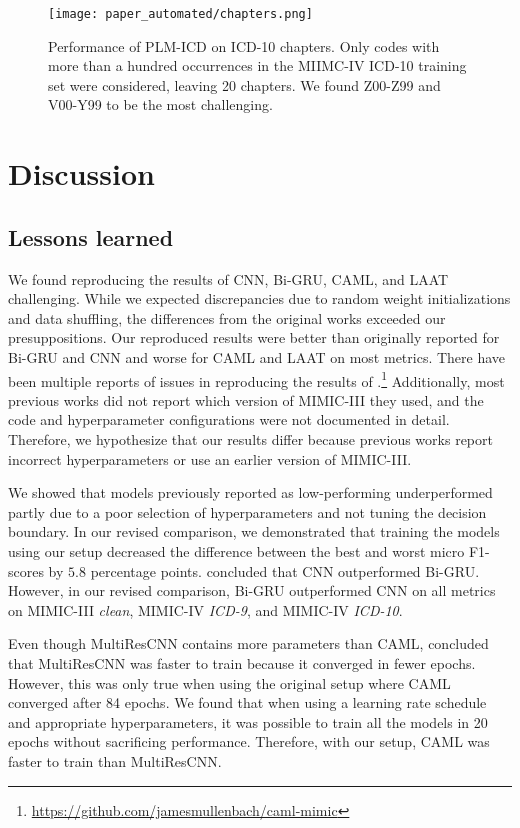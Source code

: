 {\begin{figure}
    \centering
    \texttt{[image: paper\_automated/chapters.png]}
    \caption[Performance of PLM-ICD on ICD-10 chapters.]{Performance of PLM-ICD on ICD-10 chapters. Only codes with more than a hundred occurrences in the MIIMC-IV ICD-10 training set were considered, leaving 20 chapters. We found Z00-Z99 and V00-Y99 to be the most challenging.}
    \label{fig:chapter_performance}
\end{figure}




\section{Discussion}
\subsection{Lessons learned}
We found reproducing the results of CNN, Bi-GRU, CAML, and LAAT challenging. While we expected discrepancies due to random weight initializations and data shuffling, the differences from the original works exceeded our presuppositions. Our reproduced results were better than originally reported for Bi-GRU and CNN and worse for CAML and LAAT on most metrics. There have been multiple reports of issues in reproducing the results of \textcite{mullenbachExplainablePredictionMedical2018}.\footnote{\url{https://github.com/jamesmullenbach/caml-mimic}} Additionally, most previous works did not report which version of MIMIC-III they used, and the code and hyperparameter configurations were not documented in detail. Therefore, we hypothesize that our results differ because previous works report incorrect hyperparameters or use an earlier version of MIMIC-III.

We showed that models previously reported as low-performing underperformed partly due to a poor selection of hyperparameters and not tuning the decision boundary. In our revised comparison, we demonstrated that training the models using our setup decreased the difference between the best and worst micro F1-scores by $5.8$ percentage points. \textcite{mullenbachExplainablePredictionMedical2018} concluded that CNN outperformed Bi-GRU. However, in our revised comparison, Bi-GRU outperformed CNN on all metrics on MIMIC-III \textit{clean}, MIMIC-IV \textit{ICD-9}, and MIMIC-IV \textit{ICD-10}.

Even though MultiResCNN contains more parameters than CAML, \textcite{liICDCodingClinical2020} concluded that MultiResCNN was faster to train because it converged in fewer epochs. However, this was only true when using the original setup where CAML converged after 84 epochs. We found that when using a learning rate schedule and appropriate hyperparameters, it was possible to train all the models in 20 epochs without sacrificing performance. Therefore, with our setup, CAML was faster to train than MultiResCNN.

}
